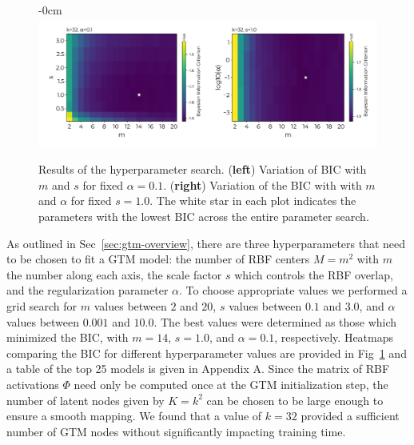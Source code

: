 \documentclass[remotesensing,article,submit,pdftex,moreauthors]{Definitions/mdpi}
\begin{document}
\begin{figure}[h]
\begin{adjustwidth}{-\extralength}{0cm}
\centering
\includegraphics[width=17.0cm]{paper/figures/results/bic.pdf}
\end{adjustwidth}
\caption{Results of the hyperparameter search. (\textbf{left}) Variation of BIC with $m$ and $s$ for fixed $\alpha=0.1$. (\textbf{right}) Variation of the BIC with with $m$ and $\alpha$ for fixed $s=1.0$. The white star in each plot indicates the parameters with the lowest BIC across the entire parameter search.\label{fig:hp-results}}
\end{figure}  

As outlined in Sec~\ref{sec:gtm-overview}, there are three hyperparameters that need to be chosen to fit a GTM model: the number of RBF centers $M=m^2$ with $m$ the number along each axis, the scale factor $s$ which controls the RBF overlap, and the regularization parameter $\alpha$. To choose appropriate values we performed a grid search for $m$ values between $2$ and $20$, $s$ values between $0.1$ and $3.0$, and $\alpha$ values between $0.001$ and $10.0$. The best values were determined as those which minimized the BIC, with $m=14$, $s=1.0$, and $\alpha=0.1$, respectively. Heatmaps comparing the BIC for different hyperparameter values are provided in Fig~\ref{fig:hp-results} and a table of the top 25 models is given in Appendix A.  Since the matrix of RBF activations $\Phi$ need only be computed once at the GTM initialization step, the number of latent nodes given by $K=k^2$ can be chosen to be large enough to ensure a smooth mapping. We found that a value of $k=32$ provided a sufficient number of GTM nodes without significantly impacting training time.
\end{document}
